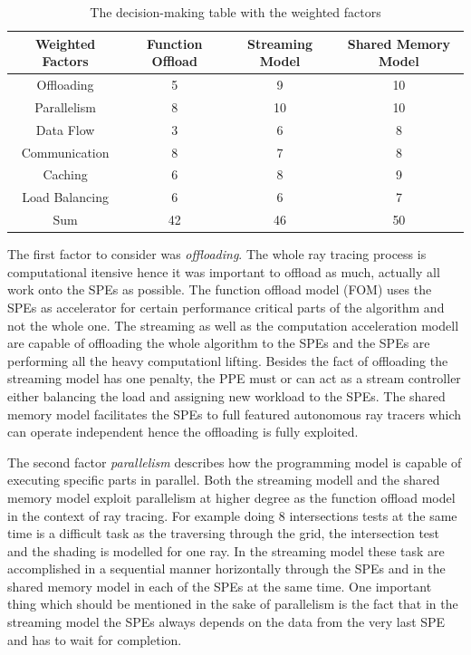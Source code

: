 \documentclass[DIV10, abstracton, openright, footsepline, headsepline, twoside, 9pt,
bigheadings]{scrreprt}
\begin{document}
\begin{table}[h]
\centering
\begin{tabular}{|c|c|c|c|}
\hline
\textbf{\textsf{{Weighted Factors}}} &
\textbf{\textsf{\textbf{Function Offload}}} &
\textbf{\textsf{\textbf{Streaming Model}}} &
\textbf{\textsf{\textbf{Shared Memory Model}}} \\
\hline
Offloading      & 5  & 9   & 10 \\ \hline
Parallelism     & 8  & 10  & 10  \\ \hline
Data Flow       & 3  & 6   & 8  \\ \hline
Communication   & 8  & 7   & 8  \\ \hline
Caching         & 6  & 8   & 9  \\ \hline
Load Balancing  & 6  & 6   & 7  \\ \hline
Sum             & 42 & 46  & 50  \\ \hline
\end{tabular}
\caption{The decision-making table with the weighted factors}
\label{tab:factors}
\end{table}

The first factor to consider was \textit{offloading}. The whole ray tracing process
is computational itensive hence it was important to offload as much, actually all work
onto the SPEs  as possible. The function offload model (FOM) uses the SPEs as
accelerator for certain performance critical parts of the algorithm and not the
whole one. The streaming as well as the computation acceleration modell are capable
of offloading the whole algorithm to the SPEs and the SPEs are performing all the
heavy computationl lifting. Besides the fact of offloading the streaming model
has one penalty, the PPE must or can act as a stream controller either balancing
the load and assigning new workload to the SPEs. The shared memory model facilitates
the SPEs to full featured autonomous ray tracers which can operate independent hence
the offloading is fully exploited.

The second factor \textit{parallelism} describes how the programming model is capable
 of executing specific parts in parallel. Both the streaming modell and the shared
memory model exploit parallelism at higher degree as the function offload model in
 the context of ray tracing. For example
doing 8 intersections tests at the same time is a difficult task as the traversing
through the grid, the intersection test and  the shading is modelled for one ray.
In the streaming model these task are accomplished in a sequential manner horizontally
through the SPEs  and in  the shared memory model in each of the SPEs at the same time.
One important thing which should be mentioned in the sake of parallelism is the fact
that in the streaming model the SPEs always depends on the data from the very last
SPE and has to wait for completion.
\end{document}
